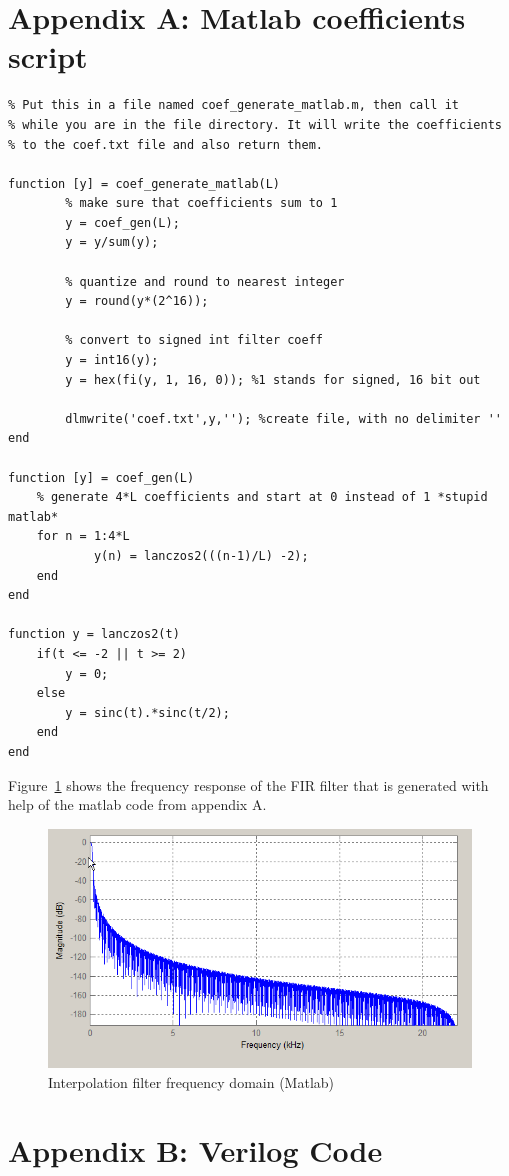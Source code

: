 \documentclass[a4paper,twoside,11pt, fleqn]{article}
\begin{document}
\newpage
\section{Appendix A: Matlab coefficients script}
\begin{lstlisting}
% Put this in a file named coef_generate_matlab.m, then call it 
% while you are in the file directory. It will write the coefficients
% to the coef.txt file and also return them.

function [y] = coef_generate_matlab(L)
        % make sure that coefficients sum to 1
        y = coef_gen(L);
        y = y/sum(y);

        % quantize and round to nearest integer
        y = round(y*(2^16)); 
             
        % convert to signed int filter coeff
        y = int16(y);
        y = hex(fi(y, 1, 16, 0)); %1 stands for signed, 16 bit out
        
        dlmwrite('coef.txt',y,''); %create file, with no delimiter ''      
end

function [y] = coef_gen(L)
    % generate 4*L coefficients and start at 0 instead of 1 *stupid matlab*
    for n = 1:4*L
            y(n) = lanczos2(((n-1)/L) -2);
    end
end

function y = lanczos2(t)
    if(t <= -2 || t >= 2)
        y = 0;
    else
        y = sinc(t).*sinc(t/2);
    end
end
\end{lstlisting}

Figure~\ref{fig:frq} shows the frequency response of the FIR filter that is generated with help of the matlab code from appendix A.

\begin{figure}[h]
	\includegraphics[scale=0.7]{Images/frequencyplot}
    \caption{Interpolation filter frequency domain (Matlab)}
    \label{fig:frq}
\end{figure}

\newpage
\section{Appendix B: Verilog Code}
\end{document}
